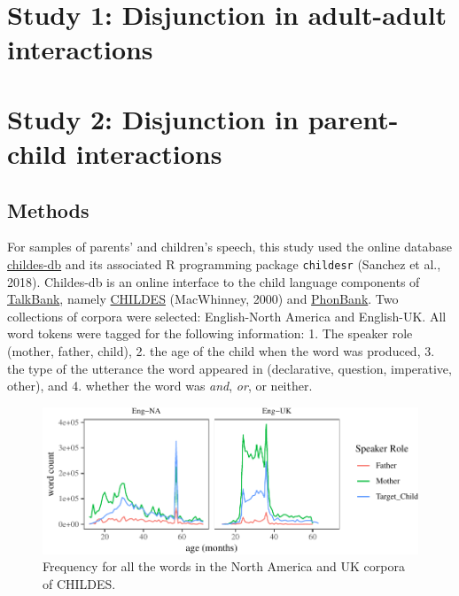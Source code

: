 \documentclass[floatsintext,man]{apa6}
\theoremstyle{definition}
\theoremstyle{definition}
\theoremstyle{definition}
\theoremstyle{remark}
\begin{document}
\section{Study 1: Disjunction in adult-adult
interactions}\label{study-1-disjunction-in-adult-adult-interactions}

\section{Study 2: Disjunction in parent-child
interactions}\label{study-2-disjunction-in-parent-child-interactions}

\subsection{Methods}\label{methods}

For samples of parents' and children's speech, this study used the
online database \href{childes-db.stanford.edu}{childes-db} and its
associated R programming package \texttt{childesr} (Sanchez et al.,
2018). Childes-db is an online interface to the child language
components of \href{https://talkbank.org/}{TalkBank}, namely
\href{https://childes.talkbank.org/}{CHILDES} (MacWhinney, 2000) and
\href{https://phonbank.talkbank.org/}{PhonBank}. Two collections of
corpora were selected: English-North America and English-UK. All word
tokens were tagged for the following information: 1. The speaker role
(mother, father, child), 2. the age of the child when the word was
produced, 3. the type of the utterance the word appeared in
(declarative, question, imperative, other), and 4. whether the word was
\emph{and}, \emph{or}, or neither.

\begin{figure}[tb]

{\centering \includegraphics{figs/corpusDensityPlot-1} 

}

\caption{Frequency for all the words in the North America and UK corpora of CHILDES.}\label{fig:corpusDensityPlot}
\end{figure}
\end{document}
